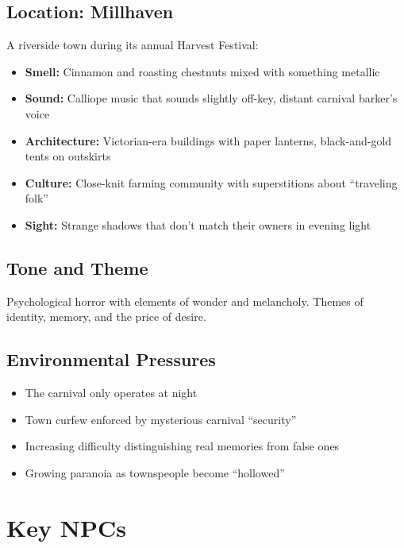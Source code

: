 \documentclass[11pt]{article}
\begin{document}
\subsection{Location: Millhaven}
A riverside town during its annual Harvest Festival:
\begin{itemize}
\item \textbf{Smell:} Cinnamon and roasting chestnuts mixed with something metallic
\item \textbf{Sound:} Calliope music that sounds slightly off-key, distant carnival barker's voice
\item \textbf{Architecture:} Victorian-era buildings with paper lanterns, black-and-gold tents on outskirts
\item \textbf{Culture:} Close-knit farming community with superstitions about ``traveling folk''
\item \textbf{Sight:} Strange shadows that don't match their owners in evening light
\end{itemize}

\subsection{Tone and Theme}
Psychological horror with elements of wonder and melancholy. Themes of identity, memory, and the price of desire.

\subsection{Environmental Pressures}
\begin{itemize}
\item The carnival only operates at night
\item Town curfew enforced by mysterious carnival ``security''
\item Increasing difficulty distinguishing real memories from false ones
\item Growing paranoia as townspeople become ``hollowed''
\end{itemize}

\section{Key NPCs}
\end{document}
